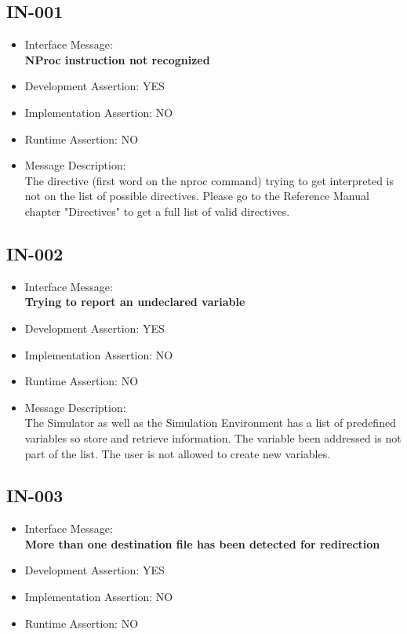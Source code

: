 %
%

\subsection{IN-001}
\begin{itemize}
  \item Interface Message:\\[1em]
    \textbf{NProc instruction not recognized}
  \item Development Assertion: YES
  \item Implementation Assertion: NO
  \item Runtime Assertion: NO
  \item Message Description:\\[1em]
    The directive (first word on the nproc command) trying to get interpreted is not on the list of possible directives. Please go to the Reference Manual chapter "Directives" to get a full list of valid directives.
\end{itemize}

\subsection{IN-002}
\begin{itemize}
  \item Interface Message:\\[1em]
    \textbf{Trying to report an undeclared variable}
  \item Development Assertion: YES
  \item Implementation Assertion: NO
  \item Runtime Assertion: NO
  \item Message Description:\\[1em]
    The Simulator as well as the Simulation Environment has a list of predefined variables so store and retrieve information. The variable been addressed is not part of the list. The user is not allowed to create new variables.
\end{itemize}

\subsection{IN-003}
\begin{itemize}
  \item Interface Message:\\[1em]
    \textbf{More than one destination file has been detected for redirection}
  \item Development Assertion: YES
  \item Implementation Assertion: NO
  \item Runtime Assertion: NO
\end{itemize}

